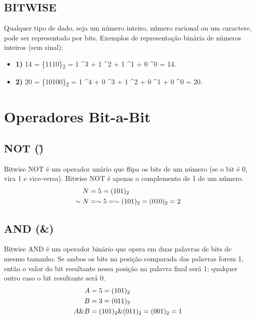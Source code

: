 \documentclass{article}
\begin{document}
\subsection{BITWISE}

Qualquer tipo de dado, seja um número inteiro, número racional ou um caractere, pode ser representado por bits. Exemplos de representação binária de números inteiros (sem sinal):

\begin{itemize}
    \item \textbf{1)} 14 = \{1110\}\textsubscript{2} = 1 ^3 + 1 ^2 + 1 ^1 + 0 ^0 = 14.
    \item \textbf{2)} 20 = \{10100\}\textsubscript{2} = 1 ^4 + 0 ^3 + 1 ^2 + 0 ^1 + 0 ^0 = 20.
\end{itemize}

\section{Operadores Bit-a-Bit}

\subsection{NOT (\~)}
Bitwise NOT é um operador unário que flipa os bits de um número (se o bit é 0, vira 1 e vice-versa). Bitwise NOT é apenas o complemento de 1 de um número.
\begin{align*}
N &= 5 = (101)\textsubscript{2} \\
\sim N &= \sim 5 = \sim (101)\textsubscript{2} = (010)\textsubscript{2} = 2
\end{align*}

\subsection{AND (\&)}
Bitwise AND é um operador binário que opera em duas palavras de bits de mesmo tamanho. Se ambos os bits na posição comparada das palavras forem 1, então o valor do bit resultante nessa posição na palavra final será 1; qualquer outro caso o bit resultante será 0.
\begin{align*}
A &= 5 = (101)\textsubscript{2} \\
B &= 3 = (011)\textsubscript{2} \\
A \& B &= (101)\textsubscript{2} \& (011)\textsubscript{2} = (001)\textsubscript{2} = 1
\end{align*}
\end{document}
